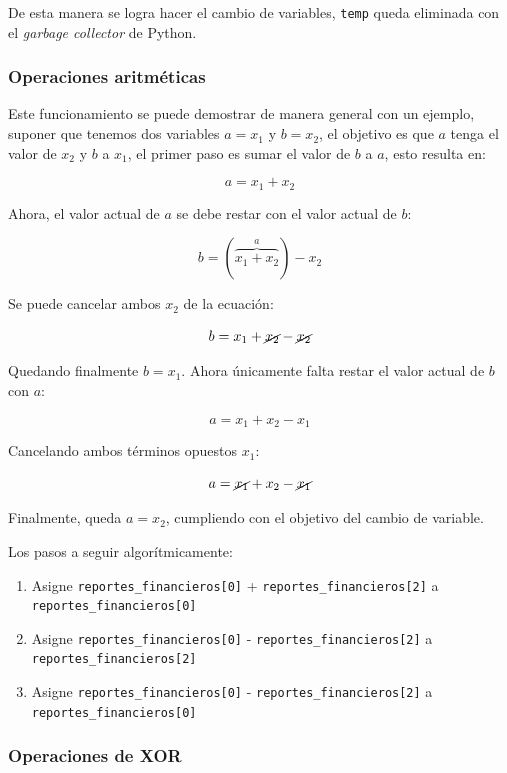 \documentclass{article}
\begin{document}
De esta manera se logra hacer el cambio de variables, \texttt{temp} queda eliminada con el \textit{garbage collector} de Python.

\subsubsection{Operaciones aritméticas}

Este funcionamiento se puede demostrar de manera general con un ejemplo, suponer que tenemos dos variables \(a = x_1\) y \(b = x_2\), el objetivo es que \(a\) tenga el valor de \(x_2\) y \(b\) a \(x_1\), el primer paso es sumar el valor de \(b\) a \(a\), esto resulta en:

\[
a = x_1 + x_2
\]

Ahora, el valor actual de \(a\) se debe restar con el valor actual de \(b\):

\[
b = (\overbrace{x_1 + x_2}^{a}) - x_2
\]

Se puede cancelar ambos \(x_2\) de la ecuación:

\[
  b = x_1 + \cancel{x_2} - \cancel{x_2} 
\]

Quedando finalmente \(b = x_1\). Ahora únicamente falta restar el valor actual de \(b\) con \(a\):

\[
a = x_1 + x_2 - x_1
\]

Cancelando ambos términos opuestos \(x_1\):

\[
a = \cancel{x_1} + x_2 - \cancel{x_1}
\]

Finalmente, queda \(a = x_2\), cumpliendo con el objetivo del cambio de variable.

Los pasos a seguir algorítmicamente:

\begin{enumerate}
  \item Asigne \texttt{reportes\_financieros[0]} + \texttt{reportes\_financieros[2]} a \texttt{reportes\_financieros[0]}
  \item Asigne \texttt{reportes\_financieros[0]} - \texttt{reportes\_financieros[2]} a \texttt{reportes\_financieros[2]}
  \item Asigne \texttt{reportes\_financieros[0]} - \texttt{reportes\_financieros[2]} a \texttt{reportes\_financieros[0]}
\end{enumerate}


\subsubsection{Operaciones de XOR}
\end{document}
